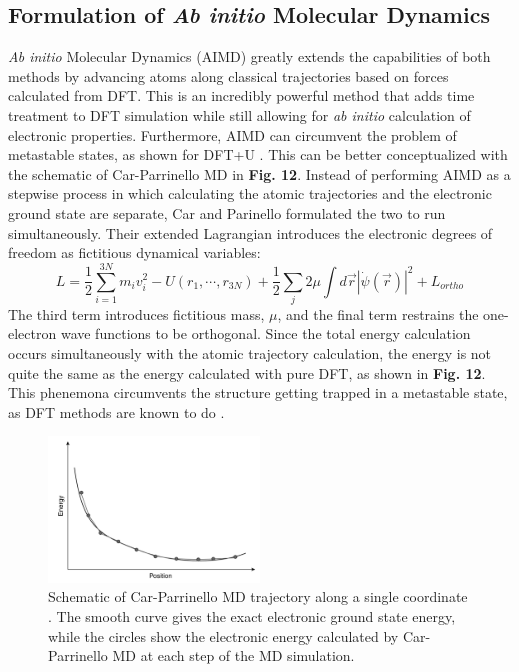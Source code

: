 \documentclass[3p,review,12pt]{elsarticle}
\begin{document}
\subsection{Formulation of \emph{Ab initio} Molecular Dynamics}
\emph{Ab initio} Molecular Dynamics (AIMD) greatly extends the capabilities of both methods by advancing atoms along classical trajectories based on forces calculated from DFT\cite{Sholl2009}.
This is an incredibly powerful method that adds time treatment to DFT simulation while still allowing for \emph{ab initio} calculation of electronic properties. Furthermore, AIMD can circumvent the problem of metastable states, as shown for DFT+U \cite{Zhang2015}. This can be better conceptualized with the schematic of Car-Parrinello MD in \textbf{Fig. 12}. Instead of performing AIMD as a stepwise process in which calculating the atomic trajectories and the electronic ground state are separate, Car and Parinello formulated the two to run simultaneously. Their extended Lagrangian introduces the electronic degrees of freedom as fictitious dynamical variables:
\begin{equation}
L =\frac{1}{2}\sum_{i=1}^{3N}m_{i}v^{2}_{i}-U(r_{1}, \cdots, r_{3N})+\frac{1}{2}\sum_{j}2\mu \int d\vec{r}|\dot{\psi}(\vec{r})|^{2}+L_{ortho}
\end{equation}
The third term introduces fictitious mass, $\mu$, and the final term restrains the one-electron wave functions to be orthogonal. Since the total energy calculation occurs simultaneously with the atomic trajectory calculation, the energy is not quite the same as the energy calculated with pure DFT, as shown in \textbf{Fig. 12}. This phenemona circumvents the structure getting trapped in a metastable state, as DFT methods are known to do \cite{Dorado2013}.
\begin{figure}[h]
	\includegraphics[width=0.5\textwidth]{practical1}
	\centering
	\caption{Schematic of Car-Parrinello MD trajectory along a single coordinate \cite{Sholl2009}. The smooth curve gives the exact electronic ground state energy, while the circles show the electronic energy calculated by Car-Parrinello MD at each step of the MD simulation.} 
\end{figure}
\end{document}
